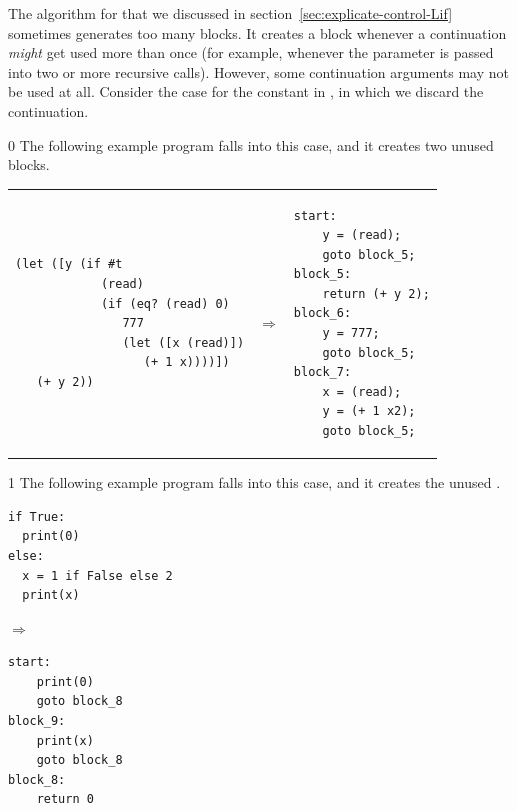 \documentclass[7x10]{TimesAPriori_MIT}%
\def\racketEd{0}
\def\pythonEd{1}
\def\edition{1}
\numberwithin{theorem}{chapter}
\numberwithin{definition}{chapter}
\numberwithin{equation}{chapter}
\begin{document}
The algorithm for  that we discussed in
section~\ref{sec:explicate-control-Lif} sometimes generates too many
blocks. It creates a block whenever a continuation \emph{might} get
used more than once (for example, whenever the  parameter
is passed into two or more recursive calls). However, some
continuation arguments may not be used at all. Consider the case for
the constant \TRUE{} in , in which we discard
the  continuation.
%
{\if\edition\racketEd
The following example program falls into this
case, and it creates two unused blocks.       
\begin{center}
\begin{tabular}{lll}
\begin{minipage}{0.4\textwidth}
\begin{lstlisting}
(let ([y (if #t
            (read)
            (if (eq? (read) 0)
               777
               (let ([x (read)])
                  (+ 1 x))))])
   (+ y 2))
\end{lstlisting}
\end{minipage}
&
$\Rightarrow$
&
\begin{minipage}{0.4\textwidth}
\begin{lstlisting}
start:
    y = (read);
    goto block_5;
block_5:
    return (+ y 2);
block_6:
    y = 777;
    goto block_5;
block_7:
    x = (read);
    y = (+ 1 x2);
    goto block_5;
\end{lstlisting}
\end{minipage}
\end{tabular} 
\end{center}
\fi}
{\if\edition\pythonEd
The following example program falls into this
case, and it creates the unused .       
\begin{center}
\begin{minipage}{0.4\textwidth}
\begin{lstlisting}
if True:
  print(0)
else:
  x = 1 if False else 2
  print(x)
\end{lstlisting}
\end{minipage}
$\Rightarrow\qquad\qquad$
\begin{minipage}{0.4\textwidth}
\begin{lstlisting}
start:
    print(0)
    goto block_8
block_9:
    print(x)
    goto block_8
block_8:
    return 0
\end{lstlisting}
\end{minipage}
\end{center}
\fi}
\end{document}
